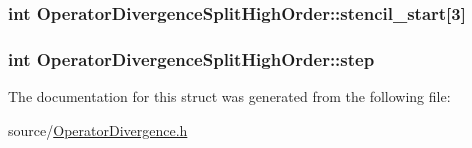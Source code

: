 \subsubsection[{stencil\+\_\+start}]{\setlength{\rightskip}{0pt plus 5cm}int Operator\+Divergence\+Split\+High\+Order\+::stencil\+\_\+start\mbox{[}3\mbox{]}}\label{struct_operator_divergence_split_high_order_a515b56b79c9da531fa0164946a497f04}
\hypertarget{struct_operator_divergence_split_high_order_abcbe4e231301629b5a48c5f0b789af2b}{}
\subsubsection[{step}]{\setlength{\rightskip}{0pt plus 5cm}int Operator\+Divergence\+Split\+High\+Order\+::step}\label{struct_operator_divergence_split_high_order_abcbe4e231301629b5a48c5f0b789af2b}


The documentation for this struct was generated from the following file\+:\begin{DoxyCompactItemize}
\item 
source/\hyperlink{_operator_divergence_8h}{Operator\+Divergence.\+h}\end{DoxyCompactItemize}
